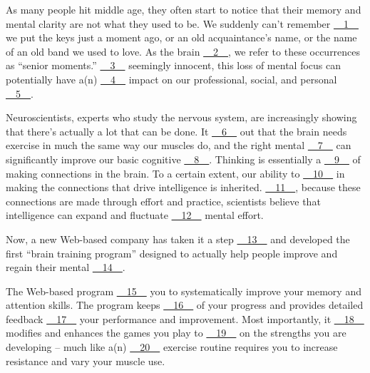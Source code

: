 As many people hit middle age, they often start to notice that their memory and mental clarity are not what they used to be. We suddenly can't remember \uline{~~1~~} we put the keys just a moment ago, or an old acquaintance's name, or the name of an old band we used to love. As the brain \uline{~~2~~}, we refer to these occurrences as ``senior moments.'' \uline{~~3~~} seemingly innocent, this loss of mental  focus can potentially have a(n) \uline{~~4~~} impact on our professional, social, and personal \uline{~~5~~}.


Neuroscientists, experts who study the nervous system, are increasingly showing that there's actually a lot that can be done. It \uline{~~6~~} out that the brain needs exercise in much the same way our muscles do, and the right mental \uline{~~7~~} can significantly improve our basic cognitive \uline{~~8~~}. Thinking is essentially a \uline{~~9~~} of making connections in the brain. To a certain extent, our ability to \uline{~~10~~} in making the connections that drive intelligence is inherited. \uline{~~11~~}, because these connections are made through effort and practice, scientists believe  that intelligence can expand  and fluctuate \uline{~~12~~} mental  effort.


Now, a new Web-based company has taken it a  step \uline{~~13~~} and developed the first ``brain training program'' designed to actually help people improve and regain their mental \uline{~~14~~}.


The Web-based  program \uline{~~15~~} you to systematically improve your  memory and attention skills. The program keeps \uline{~~16~~} of your progress and provides detailed feedback \uline{~~17~~} your performance and improvement. Most importantly, it \uline{~~18~~} modifies and enhances the games you play to \uline{~~19~~} on  the strengths you are developing – much like a(n) \uline{~~20~~} exercise routine requires you to increase resistance and vary your muscle use.